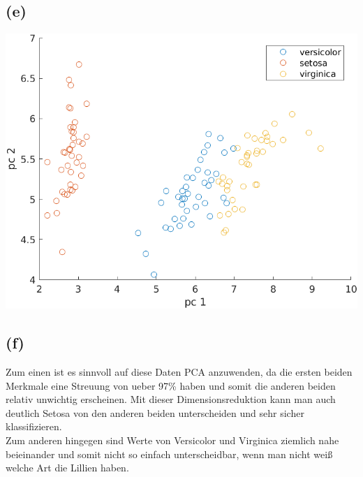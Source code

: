 \documentclass[a4paper]{scrartcl}
\begin{document}
\subsection*{(e)}
\begin{center}
	\includegraphics*[scale = 0.75]{assignment4_data/plots/q3_e.png}
\end{center}

\subsection*{(f)}
Zum einen ist es sinnvoll auf diese Daten PCA anzuwenden, da die ersten beiden Merkmale eine Streuung von ueber 97\% haben und somit die anderen beiden relativ unwichtig erscheinen. Mit dieser Dimensionsreduktion kann man auch deutlich Setosa von den anderen beiden unterscheiden und sehr sicher klassifizieren.\\
Zum anderen hingegen sind Werte von Versicolor und Virginica ziemlich nahe beieinander und somit nicht so einfach unterscheidbar, wenn man nicht weiß welche Art die Lillien haben. 
\end{document}
